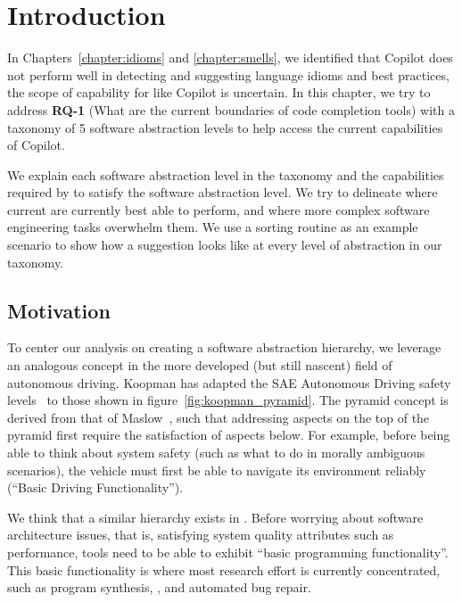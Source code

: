 \label{chapter:framework}

\section{Introduction}
In Chapters~\ref{chapter:idioms} and \ref{chapter:smells}, we identified that Copilot does not perform well in detecting and suggesting language idioms and best practices, 
the scope of capability for \cct{} like Copilot is uncertain. In this chapter, we try to address \textbf{RQ-1} (What are the current boundaries of code completion tools) with a taxonomy of 5 software abstraction levels to help access the current capabilities of Copilot. 

We explain each software abstraction level in the taxonomy and the capabilities required by \cct{} to satisfy the software abstraction level. 
We try to delineate where current \cct{} are currently best able to perform, and where more complex software engineering tasks overwhelm them. We use a sorting routine as an example scenario to show how a \cct{} suggestion looks like at every level of abstraction in our taxonomy.

\subsection{Motivation}
To center our analysis on creating a software abstraction hierarchy, we leverage an analogous concept in the more developed (but still nascent) field of autonomous driving. 
Koopman has adapted the SAE Autonomous Driving safety levels~\cite{sae} to those shown in figure~\ref{fig:koopman_pyramid}. 
The pyramid concept is derived from that of Maslow~\cite{Maslow1943}, such that addressing aspects on the top of the pyramid first require the satisfaction of aspects below. 
For example, before being able to think about system safety (such as what to do in morally ambiguous scenarios), the vehicle must first be able to navigate its environment reliably (``Basic Driving Functionality'').

We think that a similar hierarchy exists in \AISE{}. Before worrying about software architecture issues, that is, satisfying system quality attributes such as performance, \AISE{} tools need to be able to exhibit ``basic programming functionality''. This basic functionality is where most research effort is currently concentrated, such as program synthesis, \cct{}, and automated bug repair.

